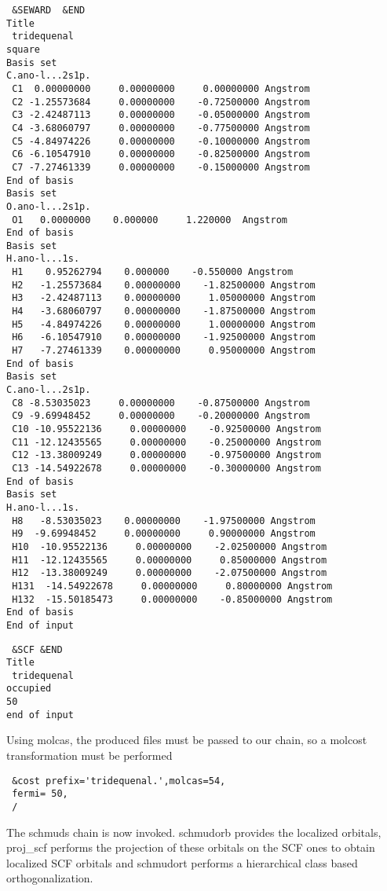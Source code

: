 \documentclass[11pt,a4paper]{article}
\begin{document}
\begin{verbatim}
 &SEWARD  &END
Title
 tridequenal
square
Basis set
C.ano-l...2s1p.
 C1  0.00000000     0.00000000     0.00000000 Angstrom
 C2 -1.25573684     0.00000000    -0.72500000 Angstrom
 C3 -2.42487113     0.00000000    -0.05000000 Angstrom
 C4 -3.68060797     0.00000000    -0.77500000 Angstrom
 C5 -4.84974226     0.00000000    -0.10000000 Angstrom
 C6 -6.10547910     0.00000000    -0.82500000 Angstrom
 C7 -7.27461339     0.00000000    -0.15000000 Angstrom
End of basis
Basis set
O.ano-l...2s1p.
 O1   0.0000000    0.000000     1.220000  Angstrom
End of basis
Basis set
H.ano-l...1s.
 H1    0.95262794    0.000000    -0.550000 Angstrom
 H2   -1.25573684    0.00000000    -1.82500000 Angstrom
 H3   -2.42487113    0.00000000     1.05000000 Angstrom
 H4   -3.68060797    0.00000000    -1.87500000 Angstrom
 H5   -4.84974226    0.00000000     1.00000000 Angstrom
 H6   -6.10547910    0.00000000    -1.92500000 Angstrom
 H7   -7.27461339    0.00000000     0.95000000 Angstrom
End of basis
Basis set
C.ano-l...2s1p.
 C8 -8.53035023     0.00000000    -0.87500000 Angstrom
 C9 -9.69948452     0.00000000    -0.20000000 Angstrom
 C10 -10.95522136     0.00000000    -0.92500000 Angstrom
 C11 -12.12435565     0.00000000    -0.25000000 Angstrom
 C12 -13.38009249     0.00000000    -0.97500000 Angstrom
 C13 -14.54922678     0.00000000    -0.30000000 Angstrom
End of basis
Basis set
H.ano-l...1s.
 H8   -8.53035023    0.00000000    -1.97500000 Angstrom
 H9  -9.69948452     0.00000000     0.90000000 Angstrom
 H10  -10.95522136     0.00000000    -2.02500000 Angstrom
 H11  -12.12435565     0.00000000     0.85000000 Angstrom
 H12  -13.38009249     0.00000000    -2.07500000 Angstrom
 H131  -14.54922678     0.00000000     0.80000000 Angstrom
 H132  -15.50185473     0.00000000    -0.85000000 Angstrom
End of basis
End of input
\end{verbatim}

\begin{verbatim}
 &SCF &END
Title
 tridequenal
occupied
50
end of input
\end{verbatim}

Using molcas, the produced files must be passed to our chain, so a molcost
transformation must be performed

\begin{verbatim}
 &cost prefix='tridequenal.',molcas=54,
 fermi= 50,
 /
\end{verbatim}

The schmuds chain is now invoked. schmudorb provides the localized orbitals,
proj\_scf performs the projection of these orbitals on the SCF ones to obtain
localized SCF orbitals and schmudort performs a hierarchical class based
orthogonalization.
\end{document}
